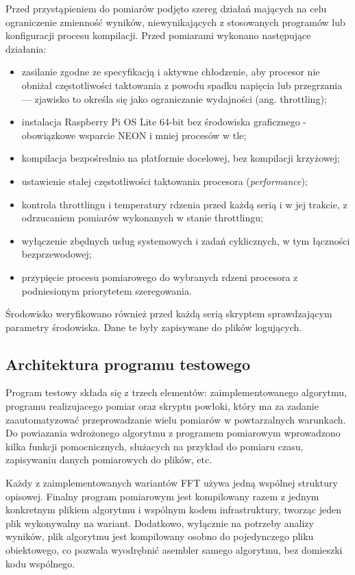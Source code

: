 Przed przystąpieniem do pomiarów podjęto szereg działań mających na celu ograniczenie
zmienność wyników, niewynikających z stosowanych programów lub konfiguracji procesu kompilacji.
Przed pomiarami wykonano następujące działania:
\begin{itemize}
    \item zasilanie zgodne ze specyfikacją i aktywne chłodzenie, aby procesor nie obniżał częstotliwości taktowania z powodu spadku napięcia lub przegrzania
     — zjawisko to określa się jako ograniczanie wydajności (ang. throttling);
    \item instalacja Raspberry Pi OS Lite 64-bit bez środowiska graficznego -
    obowiązkowe wsparcie NEON i mniej procesów w tle;
    \item kompilacja bezpośrednio na platformie docelowej, bez kompilacji
    krzyżowej;
    \item ustawienie stałej częstotliwości taktowania procesora
    (\emph{performance});
    \item kontrola throttlingu i temperatury rdzenia przed każdą serią
    i w jej trakcie, z odrzucaniem pomiarów wykonanych w stanie throttlingu;
    \item wyłączenie zbędnych usług systemowych i zadań cyklicznych, w tym
    łączności bezprzewodowej;
    \item przypięcie procesu pomiarowego do wybranych rdzeni procesora
    z podniesionym priorytetem szeregowania.
\end{itemize}
Środowisko weryfikowano również przed każdą serią skryptem sprawdzającym parametry środowiska. Dane te były zapisywane do plików logujących.

\subsection{Architektura programu testowego}
Program testowy składa się z trzech elementów: zaimplementowanego algorytmu,
programu realizujacego pomiar oraz skryptu powłoki, który ma za zadanie zaautomatyzować przeprowadzanie wielu pomiarów w powtarzalnych warunkach.
Do powiazania wdrożonego algorytmu z programem pomiarowym wprowadzono kilka funkcji pomocnicznych, służacych na przykład do pomiaru czasu, zapisywaniu danych pomiarowych do plików, etc.

Każdy z zaimplementowanych wariantów FFT używa jedną wspólnej struktury opisowej. Finalny program pomiarowym
jest kompilowany razem z jednym konkretnym plikiem algorytmu
i wspólnym kodem infrastruktury, tworząc jeden plik wykonywalny na wariant. Dodatkowo,
wyłącznie na potrzeby analizy wyników, plik algorytmu jest
kompilowany osobno do pojedynczego pliku obiektowego, co pozwala wyodrębnić
asembler samego algorytmu, bez domieszki kodu wspólnego.

